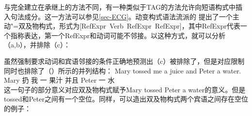 \begin{sloppypar}
与完全建立在承继上的方法不同，有一种类似于TAG的方法允许向短语构式中插入句法成分。这一方法可以参见\ref{sec-ECG}。动变构式语法流派的 \citet[]{BC2005a}提出了一个主动"=双及物构式，形式为\mbox{[RefExpr Verb RefExpr RefExpr]}，其中RefExpr代表一个指称表达，第一个RefExpr和动词可能不邻接。以这种方式，就可以分析（a,b），并排除（c）：
\end{sloppypar}
\eal
{}
\zl
虽然强制要求动词和宾语邻接的条件正确地预测出（c）被排除了，但是对应限制同时也排除了（）所示的并列结构：
\ea
\gll Mary tossed me a juice and Peter a water.\\
    Mary 扔 我 一 果汁 并且 Peter 一 水\\
\z
这一句子的部分意义对应双及物构式赋予Mary tossed Peter a water的意义。但是tossed和Peter之间有一个空位。同样，可以造出双及物构式两个宾语之间存在空位的例子：
